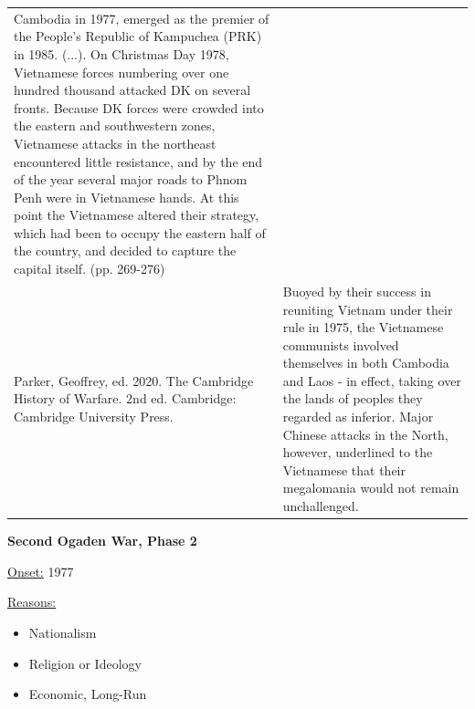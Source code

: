 {\begin{longtable}{p{}p{}}
Cambodia in 1977, emerged as the premier of the People's Republic of Kampuchea (PRK) in 1985. (...). On Christmas Day 1978, Vietnamese forces numbering over one hundred thousand attacked DK on several fronts. Because DK forces were crowded into the eastern and southwestern zones, Vietnamese attacks in the northeast encountered little resistance, and by the end of the year several major roads to Phnom Penh were in Vietnamese hands. At this point the Vietnamese altered their strategy, which had been to occupy the eastern half of the country, and decided to capture the capital itself. (pp. 269-276)
\\
Parker, Geoffrey, ed. 2020. The Cambridge History of Warfare. 2nd ed. Cambridge: Cambridge University Press. & Buoyed by their success in reuniting Vietnam under their rule in 1975, the Vietnamese communists involved themselves in both Cambodia and Laos - in effect, taking over the lands of peoples they regarded as inferior. Major Chinese attacks in the North, however, underlined to the Vietnamese that their megalomania would not remain unchallenged.
\\
\end{longtable}}
\clearpage
         \textbf{Second Ogaden War, Phase 2} 

          \underline{Onset:} 1977         

\underline{Reasons:}
\begin{itemize}
\item Nationalism
\item Religion or Ideology
\item Economic, Long-Run
\end{itemize}


